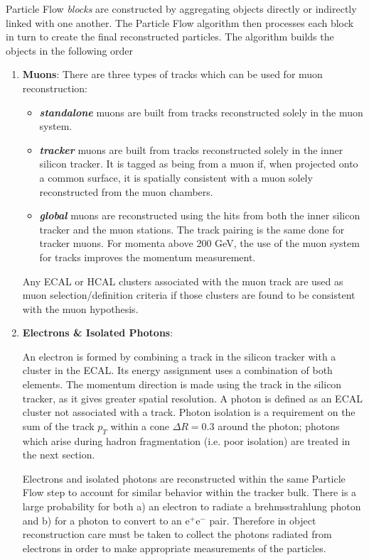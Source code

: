 Particle Flow \textit{blocks} are constructed by aggregating objects directly or indirectly linked with one another. The Particle Flow algorithm then processes each block in turn to create the final reconstructed particles. The algorithm builds the objects in the following order

\begin{enumerate}
\item \textbf{Muons}:
There are three types of tracks which can be used for muon reconstruction:
\begin{itemize}
\item
\textit{\textbf{standalone}} muons are built from tracks reconstructed solely in the muon system.
\item
\textit{\textbf{tracker}} muons are built from tracks reconstructed solely in the inner silicon tracker. It is tagged as being from a muon if, when projected onto a common surface, it is spatially consistent with a muon solely reconstructed from the muon chambers. 
\item
\textit{\textbf{global}} muons are reconstructed using the hits from both the inner silicon tracker and the muon stations.  The track pairing is the same done for tracker muons. For momenta above 200 GeV, the use of the muon system for tracks improves the momentum measurement.
\end{itemize}

Any ECAL or HCAL clusters associated with the muon track are used as muon selection/definition criteria if those clusters are found to be consistent with the muon hypothesis.

\item \textbf{Electrons \& Isolated Photons}:

An electron is formed by combining a track in the silicon tracker with a cluster in the ECAL. Its energy assignment uses a combination of both elements. The momentum direction is made using the track in the silicon tracker, as it gives greater spatial resolution.  A photon is defined as an ECAL cluster not associated with a track. Photon isolation is a requirement on the sum of the track $p_{T}$ within a cone $\Delta R = 0.3$ around the photon; photons which arise during hadron fragmentation (i.e. poor isolation) are treated in the next section. 

Electrons and isolated photons are reconstructed within the same Particle Flow step to account for similar behavior within the tracker bulk. There is a large probability for both a) an electron to radiate a brehmsstrahlung photon and b) for a photon to convert to an e$^{+}$e$^{-}$ pair. Therefore in object reconstruction care must be taken to collect the photons radiated from electrons in order to make appropriate measurements of the particles.


\end{enumerate}
